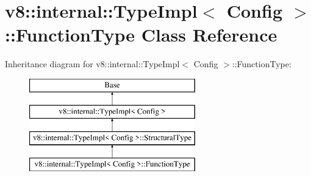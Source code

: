 \hypertarget{classv8_1_1internal_1_1_type_impl_1_1_function_type}{}\section{v8\+:\+:internal\+:\+:Type\+Impl$<$ Config $>$\+:\+:Function\+Type Class Reference}
\label{classv8_1_1internal_1_1_type_impl_1_1_function_type}
Inheritance diagram for v8\+:\+:internal\+:\+:Type\+Impl$<$ Config $>$\+:\+:Function\+Type\+:\begin{figure}[H]
\begin{center}
\leavevmode
\includegraphics[height=4.000000cm]{classv8_1_1internal_1_1_type_impl_1_1_function_type}
\end{center}
\end{figure}
